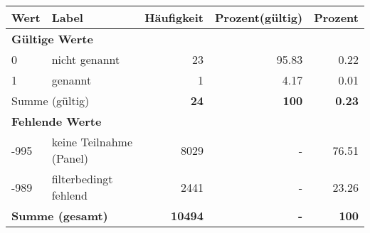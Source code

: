      \begin{longtable}{lXrrr}
     \toprule
     \textbf{Wert} & \textbf{Label} & \textbf{Häufigkeit} & \textbf{Prozent(gültig)} & \textbf{Prozent} \\
     \endhead
     \midrule
     \multicolumn{5}{l}{\textbf{Gültige Werte}}\\

     0 &
     \multicolumn{1}{X}{ nicht genannt   } &


       \num{23} &
       \num[round-mode=places,round-precision=2]{95,83} &
         \num[round-mode=places,round-precision=2]{0,22} \\

     1 &
     \multicolumn{1}{X}{ genannt   } &


       \num{1} &
       \num[round-mode=places,round-precision=2]{4,17} &
         \num[round-mode=places,round-precision=2]{0,01} \\
     \midrule
     \multicolumn{2}{l}{Summe (gültig)} &
       \textbf{\num{24}} &
     \textbf{100} &
       \textbf{\num[round-mode=places,round-precision=2]{0,23}} \\
     \multicolumn{5}{l}{\textbf{Fehlende Werte}}\\
       -995 &
       keine Teilnahme (Panel) &
         \num{8029} &
        - &
         \num[round-mode=places,round-precision=2]{76,51} \\
       -989 &
       filterbedingt fehlend &
         \num{2441} &
        - &
         \num[round-mode=places,round-precision=2]{23,26} \\
     \midrule
     \multicolumn{2}{l}{\textbf{Summe (gesamt)}} &
          \textbf{\num{10494}} &
        \textbf{-} &
        \textbf{100} \\
     \bottomrule
     \end{longtable}
     
